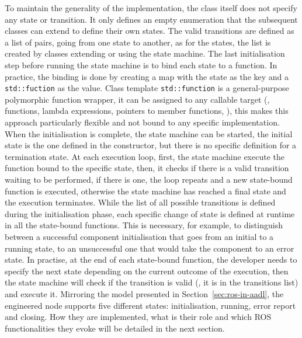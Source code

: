 To maintain the generality of the implementation, the class itself does not specify any state or transition. It only defines an empty enumeration that the subsequent classes can extend to define their own states. The valid transitions are defined as a list of pairs, going from one state to another, as for the states, the list is created by classes extending or using the state machine. The last initialisation step before running the state machine is to bind each state to a function. In practice, the binding is done by creating a map with the state as the key and a \texttt{std::fuction} as the value. Class template \texttt{std::function} is a general-purpose polymorphic function wrapper, it can be assigned to any callable target (\eg, functions, lambda expressions, pointers to member functions, \etc), this makes this approach particularly flexible and not bound to any specific implementation. When the initialisation is complete, the state machine can be started, the initial state is the one defined in the constructor, but there is no specific definition for a termination state. At each execution loop, first, the state machine execute the function bound to the specific state, then, it checks if there is a valid transition waiting to be performed, if there is one, the loop repeats and a new state-bound function is executed, otherwise the state machine has reached a final state and the execution terminates. While the list of all possible transitions is defined during the initialisation phase, each specific change of state is defined at runtime in all the state-bound functions. This is necessary, for example, to distinguish between a successful component initialisation that goes from an initial to a running state, to an unsuccessful one that would take the component to an error state. In practise, at the end of each state-bound function, the developer needs to specify the next state depending on the current outcome of the execution, then the state machine will check if the transition is valid (\ie, it is in the transitions list) and execute it. Mirroring the model presented in Section~\ref{sec:ros-in-aadl}, the engineered node supports five different states: initialisation, running, error report and closing. How they are implemented, what is their role and which ROS functionalities they evoke will be detailed in the next section.

